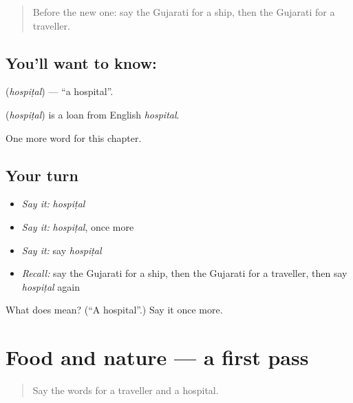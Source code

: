 \label{lesson:GU-C127-hospital}



\begin{quote}
Before the new one: say the Gujarati for a ship, then the Gujarati for a traveller.
\end{quote}

\subsection*{You'll want to know: }
\textbf{} (\emph{hospiṭal}) — \textquotedblleft{}a hospital\textquotedblright{}.

\begin{cousinweb}
\textbf{} (\emph{hospiṭal}) is a loan from English \emph{hospital}.
\end{cousinweb}

\begin{grammarlens}[title={What you've built}]
One more word for this chapter.
\end{grammarlens}

\subsection*{Your turn}
\begin{itemize}
\raggedright
  \item \emph{Say it:} \emph{hospiṭal}
  \item \emph{Say it:} \emph{hospiṭal}, once more
  \item \emph{Say it:} say \emph{hospiṭal}
  \item \emph{Recall:} say the Gujarati for a ship, then the Gujarati for a traveller, then say \emph{hospiṭal} again
\end{itemize}

\begin{tcolorbox}[breakable,colback=teal!4,colframe=teal!35!black,title={Before you move on}]
What does  mean? (\textquotedblleft{}A hospital\textquotedblright{}.) Say it once more.
\end{tcolorbox}
\section[(dialogue)]{Food and nature — a first pass}

\label{lesson:GU-R127-first-pass-food-and-nature}



\begin{quote}
Say the words for a traveller and a hospital.
\end{quote}

